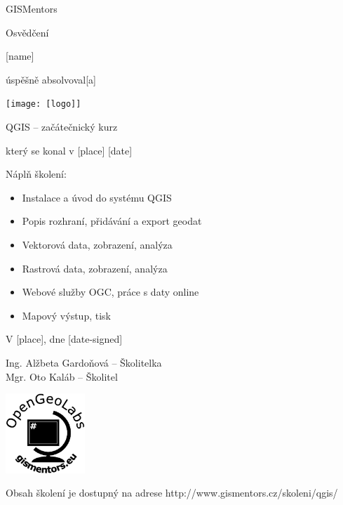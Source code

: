 \documentclass[12pt, a4paper]{letter}
\begin{document}
\pagestyle{empty}
\begin{center}

{\Large GISMentors}

{\Huge Osvědčení}

{\Large [name]}

úspěšně absolvoval[a]

\texttt{[image: [logo]]}

{\Large QGIS -- začátečnický kurz}

který se konal v [place] [date]
\end{center}

Náplň školení:

\begin{itemize}
    \item Instalace a úvod do systému QGIS
    \item Popis rozhraní, přidávání a export geodat
    \item Vektorová data, zobrazení, analýza
    \item Rastrová data, zobrazení, analýza
    \item Webové služby OGC, práce s daty online
    \item Mapový výstup, tisk
\end{itemize}

\vfill
\parbox{7cm}{

    V [place], dne [date-signed]\\

\vfill

    Ing. Alžbeta Gardoňová -- Školitelka\\

\vfill
    Mgr. Oto Kaláb -- Školitel
}
\hfill
\parbox{3cm}{
    \includegraphics[width=3cm]{../images/placka.eps}
}


\begin{center}
{\footnotesize Obsah školení je dostupný na adrese
http://www.gismentors.cz/skoleni/qgis/}
\end{center}
\end{document}
